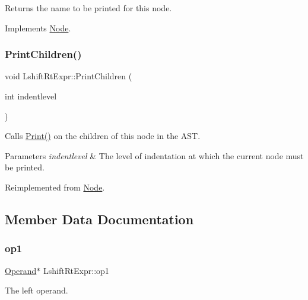 Returns the name to be printed for this node. 

Implements \hyperlink{class_node_a56e29657306ffb004d69c6929ae44269}{Node}.

\mbox{\label{class_lshift_rt_expr_a009f6d7041743b94598b42b0dfdb8880}} 
\subsubsection{\texorpdfstring{Print\+Children()}{PrintChildren()}}
{\footnotesize\ttfamily void Lshift\+Rt\+Expr\+::\+Print\+Children (\begin{DoxyParamCaption}\item[{int}]{indentlevel }\end{DoxyParamCaption})\hspace{0.3cm}{\ttfamily [virtual]}}

Calls \hyperlink{class_node_a9ef727fd72d1a37792b3db60a8a479dd}{Print()} on the children of this node in the A\+ST. 
\begin{DoxyParams}{Parameters}
{\em indentlevel} & The level of indentation at which the current node must be printed. \\
\hline
\end{DoxyParams}


Reimplemented from \hyperlink{class_node_a3e67ec8d22182b721717af14fe0c3000}{Node}.



\subsection{Member Data Documentation}
\mbox{\label{class_lshift_rt_expr_a9432fbd3b143c0b6636c6941da69221f}} 
\subsubsection{\texorpdfstring{op1}{op1}}
{\footnotesize\ttfamily \hyperlink{class_operand}{Operand}$\ast$ Lshift\+Rt\+Expr\+::op1\hspace{0.3cm}{\ttfamily [protected]}}

The left operand. \mbox{\label{class_lshift_rt_expr_aa73e269a6813c1acab7446e3bdc794d4}} 
